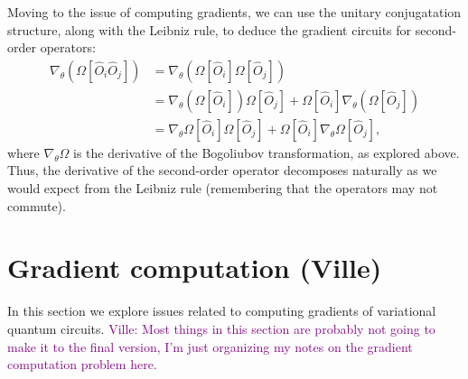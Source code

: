 \documentclass[aps,pra,10pt,twocolumn,groupedaddress,nofootinbib]{revtex4-1}
\theoremstyle{plain}
\newcommand{\ville}[1]{\textcolor{purple}{Ville: #1}}
\begin{document}
Moving to the issue of computing gradients, we can use the unitary conjugatation structure, along with the Leibniz rule, to deduce the gradient circuits for second-order operators:
\begin{align}
 \nabla_\theta\left(\Omega[\hat{O}_i\hat{O}_j] \right)
 & = \nabla_\theta\left(\Omega[\hat{O}_i] \Omega[\hat{O}_j]\right) \nonumber \\
 & = \nabla_\theta\left( \Omega[\hat{O}_i] \right)\Omega[\hat{O}_j] 
 + \Omega[\hat{O}_i]\nabla_\theta \left( \Omega[\hat{O}_j] \right) \nonumber \\
 & = \nabla_\theta\Omega [\hat{O}_i] \Omega[\hat{O}_j] 
 + \Omega[\hat{O}_i]\nabla_\theta \Omega[\hat{O}_j],
\end{align}
where $\nabla_\theta\Omega$ is the derivative of the Bogoliubov transformation, as explored above.
Thus, the derivative of the second-order operator decomposes naturally as we would expect from the Leibniz rule (remembering that the operators may not commute).











%


\appendix




\clearpage
\appendix
\section{Gradient computation (Ville)}

In this section we explore issues related to computing gradients of variational quantum circuits.
\ville{Most things in this section are probably not going to make it to the final version,
I'm just organizing my notes on the gradient computation problem here.}
\end{document}
